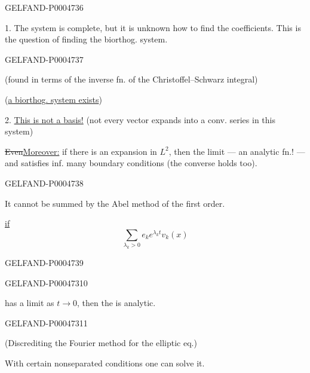 \begin{GelfandAdjacentEvidence}{GELFAND-P000473}{6}


1. The system is complete, but it is unknown how to find the coefficients.
This is the question of finding the biorthog. system.
\end{GelfandAdjacentEvidence}
\begin{GelfandAdjacentEvidence}{GELFAND-P000473}{7}

(found in terms of the inverse fn. of the Christoffel–Schwarz integral)

(\uline{a biorthog. system exists})

2. \uline{This is not a basis!} (not every vector expands into a conv. series in this system)

\sout{Even}\quad\uline{Moreover:} if there is an expansion in $L^2$,
then the limit — an analytic fn.! — and satisfies inf. many boundary conditions (the converse holds too).
\end{GelfandAdjacentEvidence}
\begin{GelfandAdjacentEvidence}{GELFAND-P000473}{8}


It cannot be summed by the Abel method of the first order.

\uline{if}
\[
\sum_{\lambda_k>0}e_k e^{\lambda_k t}v_k(x)
\]
\end{GelfandAdjacentEvidence}
\begin{GelfandAdjacentEvidence}{GELFAND-P000473}{9}

\end{GelfandAdjacentEvidence}
\begin{GelfandAdjacentEvidence}{GELFAND-P000473}{10}

has a limit as $t\to0$,
then the  is analytic.
\end{GelfandAdjacentEvidence}
\begin{GelfandAdjacentEvidence}{GELFAND-P000473}{11}


(Discrediting the Fourier method for the elliptic eq.)

With certain nonseparated conditions one can solve it.
\end{GelfandAdjacentEvidence}
